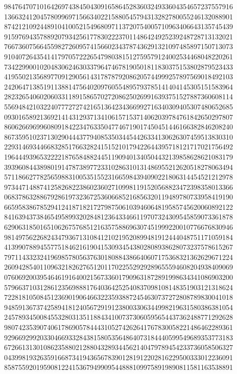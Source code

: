 {    9847647071016426974384504309165864528360324933604354657237557916 ~
    1366324120457809969715663402215880545794313282780055246132088901 ~
    8742121092448910410052154968097113720754005710963406643135745439 ~
    9159769435788920793425617783022237011486424925239248728713132021 ~
    7667360756645598272609574156602343787436291321097485897150713073 ~
    9104072643541417970572226547980381512759579124002534468048220261 ~
    7342299001020483062463033796474678190501811830375153802879523433 ~
    4195502135689770912905614317878792086205744999257897569018492103 ~
    2420647138519113881475640209760554895793785141404145305151583964 ~
    2823265406020603311891586570272086250269916393751527887360608114 ~
    5569484210322407772727421651364234366992716340309405307480652685 ~
    0930165892136921414312937134106157153714062039784761842650297807 ~
    8606266969960809184223476335047746719017450451446166382846208240 ~
    8673595102371302904443779408535034454426334130626307459513830310 ~
    2293146934466832851766328241515210179422644395718121717021756492 ~
    1964449396532222187658488244511909401340504432139858628621083179 ~
    3939608443898019147873897723310286310131486955212620518278063494 ~
    5711866277825659883100535155231665984394090221806314454521212978 ~
    9734471488741258268223860236027109981191520568823472398358013366 ~
    0683786328867928619732367253606685216856320119489780733958419190 ~
    6659583867852941241871821727987506103946064819585745620060892122 ~
    8416394373846549589932028481236433466119707324309545859073361878 ~
    6290631850165106267576851216357588696307451999220010776676830946 ~
    9814975622682434793671310841210219520899481912444048751171059184 ~
    4139907889455775184621619041530934543802808938628073237578615267 ~
    7971143323241969857805637630180884386640607175368321362629671224 ~
    2609428540110963218262765120117022552929289655594608204938409069 ~
    0760692003954646191640021567336017909631872891998634341086903200 ~
    5796637103128612356988817640364252540837098108148351903121318624 ~
    7228181050845123690190646632235938872454630737272808789830041018 ~
    9485913673742589418124056729191238003306344998219631580386381054 ~
    2457893450084553280313511884341007373060595654437362488771292628 ~
    9807423539074061786905784443105274262641767830058221486462289361 ~
    9296692992033046693328438158053564864073184440599549689353773183 ~
    6726613130108623588021288043289344562140479789454233736058506327 ~
    0439981932635916687341943656783901281912202816229500333012236091 ~
    8587559201959081224153679499095448881099758919890811581163538891 ~
}
